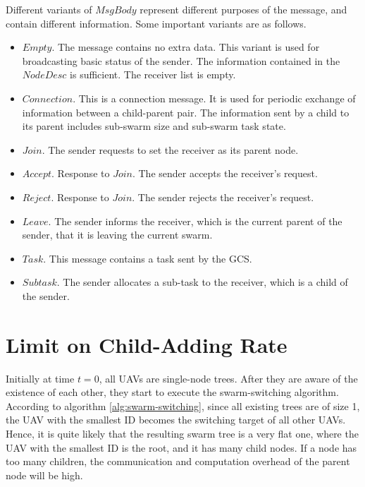 Different variants of $MsgBody$ represent different purposes of the message,
and contain different information.
Some important variants are as follows.
\begin{itemize}
    \item $Empty$. The message contains no extra data.
          This variant is used for broadcasting basic status of the sender.
          The information contained in the $NodeDesc$ is sufficient.
          The receiver list is empty.
    \item $Connection$. This is a connection message.
          It is used for periodic exchange of information between a child-parent pair.
          The information sent by a child to its parent
          includes sub-swarm size and sub-swarm task state.
    \item $Join$. The sender requests to set the receiver as its parent node.
    \item $Accept$. Response to $Join$. The sender accepts the receiver's request.
    \item $Reject$. Response to $Join$. The sender rejects the receiver's request.
    \item $Leave$. The sender informs the receiver, which is the current parent of the sender,
          that it is leaving the current swarm.
    \item $Task$. This message contains a task sent by the GCS.
    \item $Subtask$. The sender allocates a sub-task to the receiver,
          which is a child of the sender.
\end{itemize}


\section{Limit on Child-Adding Rate}

Initially at time $t = 0$, all UAVs are single-node trees.
After they are aware of the existence of each other,
they start to execute the swarm-switching algorithm.
According to algorithm \ref{alg:swarm-switching},
since all existing trees are of size 1,
the UAV with the smallest ID becomes the switching target of all other UAVs.
Hence, it is quite likely that the resulting swarm tree is a very flat one,
where the UAV with the smallest ID is the root, and it has many child nodes.
If a node has too many children,
the communication and computation overhead of the parent node will be high.

